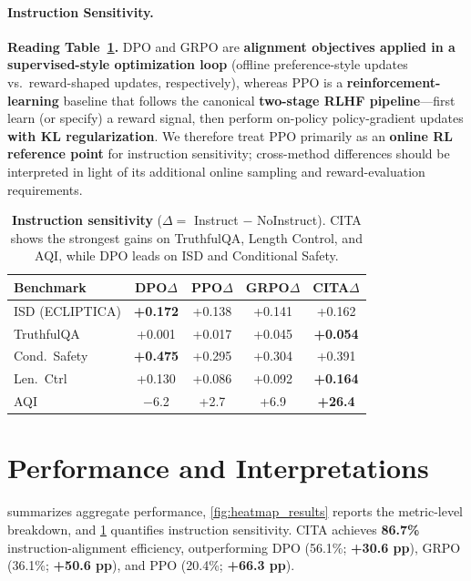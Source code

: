 \paragraph{Instruction Sensitivity.}
\label{sec:improvement_comparison}
\textbf{Reading Table~\ref{tab:improvement_comparison}.}
\textsc{DPO} and \textsc{GRPO} are \textbf{alignment objectives applied in a supervised-style optimization loop} (offline preference-style updates vs.\ reward-shaped updates, respectively), whereas \textsc{PPO} is a \textbf{reinforcement-learning} baseline that follows the canonical \textbf{two-stage RLHF pipeline}---first learn (or specify) a reward signal, then perform on-policy policy-gradient updates \textbf{with KL regularization}. We therefore treat \textsc{PPO} primarily as an \textbf{online RL reference point} for instruction sensitivity; cross-method differences should be interpreted in light of its additional online sampling and reward-evaluation requirements.

\vspace{-1.5em}
\begin{table}[H]
\centering
\footnotesize
\setlength{\tabcolsep}{4pt}
\renewcommand{\arraystretch}{1.2}
\begin{tabular}{@{}lcccc@{}}
\toprule
\textbf{Benchmark} & \textbf{DPO$\Delta$} & \textbf{PPO$\Delta$} & \textbf{GRPO$\Delta$} & \textbf{CITA$\Delta$} \\
\midrule
ISD (ECLIPTICA) & \textbf{+0.172} & +0.138 & +0.141 & +0.162 \\ \hline
TruthfulQA & +0.001 & +0.017 & +0.045 & \textbf{+0.054} \\ \hline
Cond.\ Safety & \textbf{+0.475} & +0.295 & +0.304 & +0.391 \\ \hline
Len.\ Ctrl & +0.130 & +0.086 & +0.092 & \textbf{+0.164} \\ \hline
AQI & $-$6.2 & +2.7 & +6.9 & \textbf{+26.4} \\
\bottomrule
\end{tabular}
\vspace{-0.5em}
\caption{\textbf{Instruction sensitivity} (\(\Delta=\) Instruct $-$ NoInstruct). \textsc{CITA} shows the strongest gains on TruthfulQA, Length Control, and AQI, while \textsc{DPO} leads on ISD and Conditional Safety.}
\label{tab:improvement_comparison}
\vspace{-3mm}
\end{table}

\vspace{-2mm}
\section*{Performance and Interpretations}
\label{sec:overall_results}
 summarizes aggregate performance, \cref{fig:heatmap_results} reports the metric-level breakdown, and \cref{tab:improvement_comparison} quantifies instruction sensitivity. \textsc{CITA} achieves \textbf{86.7\%} instruction-alignment efficiency, outperforming \textsc{DPO} (56.1\%; \textbf{+30.6 pp}), \textsc{GRPO} (36.1\%; \textbf{+50.6 pp}), and \textsc{PPO} (20.4\%; \textbf{+66.3 pp}).

